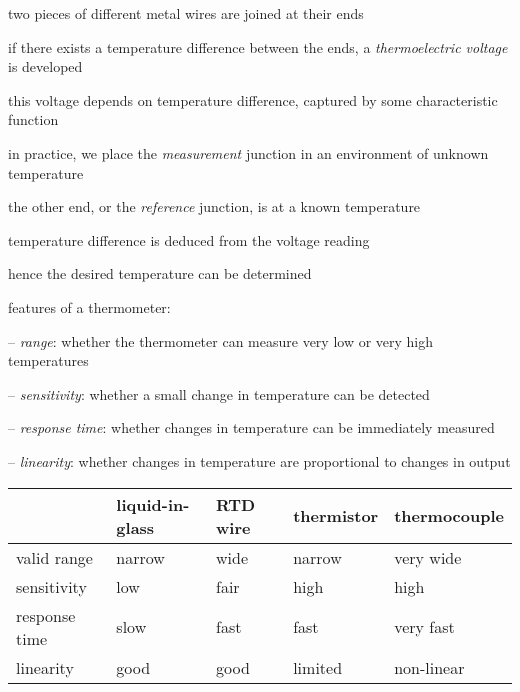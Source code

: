 two pieces of different metal wires are joined at their ends

if there exists a temperature difference between the ends, a \emph{thermoelectric voltage} is developed

this voltage depends on temperature difference, captured by some characteristic function

in practice, we place the \emph{measurement} junction in an environment of unknown temperature

the other end, or the \emph{reference} junction, is at a known temperature

temperature difference is deduced from the voltage reading

hence the desired temperature can be determined

\vspace*{\baselineskip}

\cmt features of a thermometer:
\begin{compactitem}
	\item[--] \emph{range}: whether the thermometer can measure very low or very high temperatures
	
	\item[--] \emph{sensitivity}: whether a small change in temperature can be detected
	
	\item[--] \emph{response time}: whether changes in temperature can be immediately measured
	
	\item[--] \emph{linearity}: whether changes in temperature are proportional to changes in output
	
\end{compactitem}

%
\begin{fullwidth}
    

\begin{center}
	\begin{tabular}{|l|C{2.4cm}|C{2.4cm}|C{2.4cm}|C{2.4cm}|}
		\hline 
		& liquid-in-glass & RTD wire & thermistor & thermocouple \\ 
		\hline 
		valid range & narrow & wide & narrow & very wide \\ 
		\hline 
		sensitivity & low & fair & high & high \\ 
		\hline 
		response time & slow & fast & fast & very fast \\ 
		\hline 
		linearity & good & good & limited & non-linear \\ 
		\hline 
	\end{tabular} 
\end{center}
\end{fullwidth}

